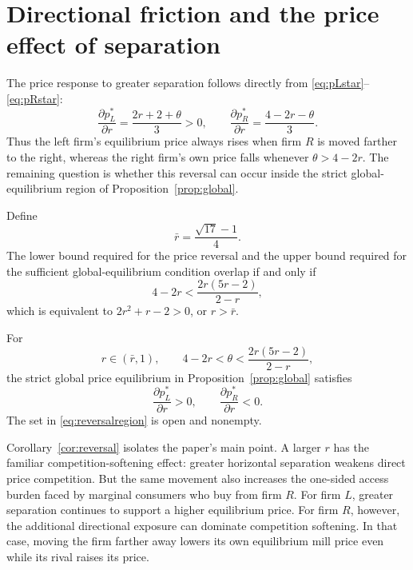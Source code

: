 \section{Directional friction and the price effect of separation}\label{sec:result}

The price response to greater separation follows directly from \eqref{eq:pLstar}--\eqref{eq:pRstar}:
\begin{equation}
\frac{\partial p_L^*}{\partial r}
=\frac{2r+2+\theta}{3}>0,
\qquad
\frac{\partial p_R^*}{\partial r}
=\frac{4-2r-\theta}{3}.
\label{eq:price_derivatives}
\end{equation}
Thus the left firm's equilibrium price always rises when firm $R$ is moved farther to the right, whereas the right firm's own price falls whenever $\theta>4-2r$. The remaining question is whether this reversal can occur inside the strict global-equilibrium region of Proposition~\ref{prop:global}.

Define
\begin{equation}
\bar r=\frac{\sqrt{17}-1}{4}.
\end{equation}
The lower bound required for the price reversal and the upper bound required for the sufficient global-equilibrium condition overlap if and only if
\begin{equation}
4-2r<\frac{2r(5r-2)}{2-r},
\end{equation}
which is equivalent to $2r^2+r-2>0$, or $r>\bar r$.

\begin{corollary}\label{cor:reversal}
For
\begin{equation}
r\in(\bar r,1),
\qquad
4-2r<\theta<\frac{2r(5r-2)}{2-r},
\label{eq:reversalregion}
\end{equation}
the strict global price equilibrium in Proposition~\ref{prop:global} satisfies
\begin{equation}
\boxed{
\frac{\partial p_L^*}{\partial r}>0,
\qquad
\frac{\partial p_R^*}{\partial r}<0.}
\label{eq:reversal}
\end{equation}
The set in \eqref{eq:reversalregion} is open and nonempty.
\end{corollary}

Corollary~\ref{cor:reversal} isolates the paper's main point. A larger $r$ has the familiar competition-softening effect: greater horizontal separation weakens direct price competition. But the same movement also increases the one-sided access burden faced by marginal consumers who buy from firm $R$. For firm $L$, greater separation continues to support a higher equilibrium price. For firm $R$, however, the additional directional exposure can dominate competition softening. In that case, moving the firm farther away lowers its own equilibrium mill price even while its rival raises its price.


